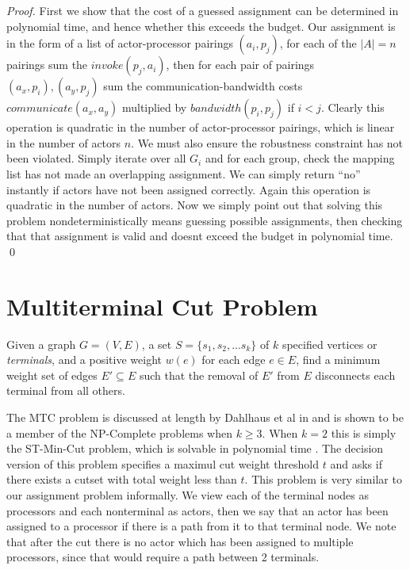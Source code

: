 \documentclass{article}
\begin{document}
\begin{proof}
First we show that the cost of a guessed assignment can be determined in polynomial time, and hence whether this exceeds the budget.
Our assignment is in the form of a list of actor-processor pairings $(a_i, p_j)$, for each of the $|A| = n$ pairings sum the $invoke(p_j, a_i)$, then for each pair of pairings $(a_x, p_i), (a_y, p_j)$ sum the communication-bandwidth costs $communicate(a_x, a_y)$ multiplied by $bandwidth(p_i, p_j)$ if $i<j$.
Clearly this operation is quadratic in the number of actor-processor pairings, which is linear in the number of actors $n$.
We must also ensure the robustness constraint has not been violated.
Simply iterate over all $G_i$ and for each group, check the mapping list has not made an overlapping assignment.
We can simply return ``no'' instantly if actors have not been assigned correctly.
Again this operation is quadratic in the number of actors.
Now we simply point out that solving this problem nondeterministically means guessing possible assignments, then checking that that assignment is valid and doesnt exceed the budget in polynomial time.
\qed
\end{proof}

\section{Multiterminal Cut Problem}
Given a graph $G=(V,E)$, a set $S=\{s_1, s_2, ... s_k\}$ of $k$ specified vertices or {\em terminals}, and a positive weight $w(e)$ for each edge $e \in E$, find a minimum weight set of edges $E' \subseteq E$ such that the removal of $E'$ from $E$ disconnects each terminal from all others.

The MTC problem is discussed at length by Dahlhaus et al in \cite{dah94} and is shown to be a member of the NP-Complete problems when $k \geq 3$.
When $k = 2$ this is simply the ST-Min-Cut problem, which is solvable in polynomial time \cite{for62}.
The decision version of this problem specifies a maximul cut weight threshold $t$ and asks if there exists a cutset with total weight less than $t$.
This problem is very similar to our assignment problem informally.
We view each of the terminal nodes as processors and each nonterminal as actors, then we say that an actor has been assigned to a processor if there is a path from it to that terminal node.
We note that after the cut there is no actor which has been assigned to multiple processors, since that would require a path between 2 terminals.
\end{document}
